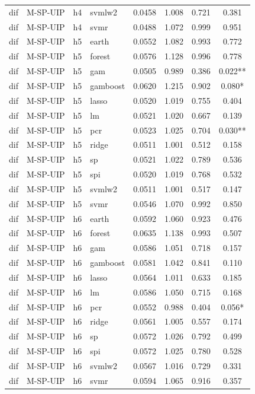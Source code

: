 \begin{ThreePartTable}
\begin{longtable}[t]{llclcccc}
dif & M-SP-UIP & h4 & svmlw2 & 0.0458 & 1.008 & 0.721 & 0.381\\
dif & M-SP-UIP & h4 & svmr & 0.0488 & 1.072 & 0.999 & 0.951\\
\addlinespace
dif & M-SP-UIP & h5 & earth & 0.0552 & 1.082 & 0.993 & 0.772\\
dif & M-SP-UIP & h5 & forest & 0.0576 & 1.128 & 0.996 & 0.778\\
dif & M-SP-UIP & h5 & gam & 0.0505 & 0.989 & 0.386 & 0.022**\\
dif & M-SP-UIP & h5 & gamboost & 0.0620 & 1.215 & 0.902 & 0.080*\\
dif & M-SP-UIP & h5 & lasso & 0.0520 & 1.019 & 0.755 & 0.404\\
dif & M-SP-UIP & h5 & lm & 0.0521 & 1.020 & 0.667 & 0.139\\
dif & M-SP-UIP & h5 & pcr & 0.0523 & 1.025 & 0.704 & 0.030**\\
dif & M-SP-UIP & h5 & ridge & 0.0511 & 1.001 & 0.512 & 0.158\\
dif & M-SP-UIP & h5 & sp & 0.0521 & 1.022 & 0.789 & 0.536\\
dif & M-SP-UIP & h5 & spi & 0.0520 & 1.019 & 0.768 & 0.532\\
dif & M-SP-UIP & h5 & svmlw2 & 0.0511 & 1.001 & 0.517 & 0.147\\
dif & M-SP-UIP & h5 & svmr & 0.0546 & 1.070 & 0.992 & 0.850\\
\addlinespace
dif & M-SP-UIP & h6 & earth & 0.0592 & 1.060 & 0.923 & 0.476\\
dif & M-SP-UIP & h6 & forest & 0.0635 & 1.138 & 0.993 & 0.507\\
dif & M-SP-UIP & h6 & gam & 0.0586 & 1.051 & 0.718 & 0.157\\
dif & M-SP-UIP & h6 & gamboost & 0.0581 & 1.042 & 0.841 & 0.110\\
dif & M-SP-UIP & h6 & lasso & 0.0564 & 1.011 & 0.633 & 0.185\\
dif & M-SP-UIP & h6 & lm & 0.0586 & 1.050 & 0.715 & 0.168\\
dif & M-SP-UIP & h6 & pcr & 0.0552 & 0.988 & 0.404 & 0.056*\\
dif & M-SP-UIP & h6 & ridge & 0.0561 & 1.005 & 0.557 & 0.174\\
dif & M-SP-UIP & h6 & sp & 0.0572 & 1.026 & 0.792 & 0.499\\
dif & M-SP-UIP & h6 & spi & 0.0572 & 1.025 & 0.780 & 0.528\\
dif & M-SP-UIP & h6 & svmlw2 & 0.0567 & 1.016 & 0.729 & 0.331\\
dif & M-SP-UIP & h6 & svmr & 0.0594 & 1.065 & 0.916 & 0.357\\

\end{longtable}
\end{ThreePartTable}

